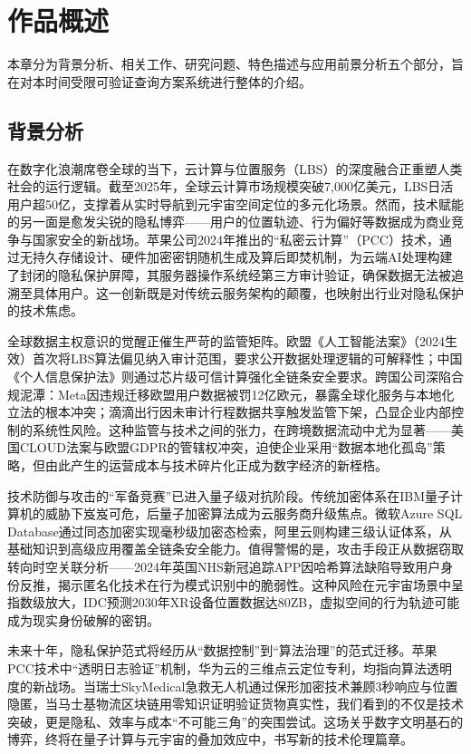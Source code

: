 \documentclass{cumcmthesis}
\numberwithin{equation}{section} %
\numberwithin{figure}{section} %
\numberwithin{table}{section} %
\begin{document}
\section{作品概述}

本章分为背景分析、相关工作、研究问题、特色描述与应用前景分析五个部分，旨在对本时间受限可验证查询方案系统进行整体的介绍。

\subsection{背景分析}

在数字化浪潮席卷全球的当下，云计算与位置服务（LBS）的深度融合正重塑人类社会的运行逻辑。截至2025年，全球云计算市场规模突破7,000亿美元，LBS日活用户超50亿，支撑着从实时导航到元宇宙空间定位的多元化场景。然而，技术赋能的另一面是愈发尖锐的隐私博弈——用户的位置轨迹、行为偏好等数据成为商业竞争与国家安全的新战场。苹果公司2024年推出的“私密云计算”（PCC）技术，通过无持久存储设计、硬件加密密钥随机生成及算后即焚机制，为云端AI处理构建了封闭的隐私保护屏障，其服务器操作系统经第三方审计验证，确保数据无法被追溯至具体用户。这一创新既是对传统云服务架构的颠覆，也映射出行业对隐私保护的技术焦虑。

全球数据主权意识的觉醒正催生严苛的监管矩阵。欧盟《人工智能法案》（2024生效）首次将LBS算法偏见纳入审计范围，要求公开数据处理逻辑的可解释性；中国《个人信息保护法》则通过芯片级可信计算强化全链条安全要求。跨国公司深陷合规泥潭：Meta因违规迁移欧盟用户数据被罚12亿欧元，暴露全球化服务与本地化立法的根本冲突；滴滴出行因未审计行程数据共享触发监管下架，凸显企业内部控制的系统性风险。这种监管与技术之间的张力，在跨境数据流动中尤为显著——美国CLOUD法案与欧盟GDPR的管辖权冲突，迫使企业采用“数据本地化孤岛”策略，但由此产生的运营成本与技术碎片化正成为数字经济的新桎梏。

技术防御与攻击的“军备竞赛”已进入量子级对抗阶段。传统加密体系在IBM量子计算机的威胁下岌岌可危，后量子加密算法成为云服务商升级焦点。微软Azure SQL Database通过同态加密实现毫秒级加密态检索，阿里云则构建三级认证体系，从基础知识到高级应用覆盖全链条安全能力。值得警惕的是，攻击手段正从数据窃取转向时空关联分析——2024年英国NHS新冠追踪APP因哈希算法缺陷导致用户身份反推，揭示匿名化技术在行为模式识别中的脆弱性。这种风险在元宇宙场景中呈指数级放大，IDC预测2030年XR设备位置数据达80ZB，虚拟空间的行为轨迹可能成为现实身份破解的密钥。

未来十年，隐私保护范式将经历从“数据控制”到“算法治理”的范式迁移。苹果PCC技术中“透明日志验证”机制，华为云的三维点云定位专利，均指向算法透明度的新战场。当瑞士SkyMedical急救无人机通过保形加密技术兼顾3秒响应与位置隐匿，当马士基物流区块链用零知识证明验证货物真实性，我们看到的不仅是技术突破，更是隐私、效率与成本“不可能三角”的突围尝试。这场关乎数字文明基石的博弈，终将在量子计算与元宇宙的叠加效应中，书写新的技术伦理篇章。
\end{document}
